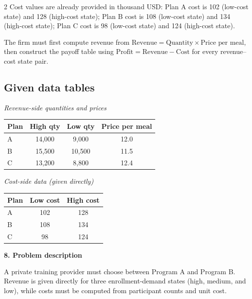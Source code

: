\documentclass[12pt]{article}
\newcommand{\SubsectionBox}[1]{%
	\noindent\colorbox{gray!30}{%
		\parbox{\linewidth}{\textbf{#1}}%
	}\par\vspace{0.35cm}%
}
\begin{document}
\begin{multicols}{2}
				Cost values are already provided in thousand USD:
				Plan A cost is 102 (low-cost state) and 128 (high-cost state);
				Plan B cost is 108 (low-cost state) and 134 (high-cost state);
				Plan C cost is 98 (low-cost state) and 124 (high-cost state).
				
				The firm must first compute revenue from
				\(\text{Revenue}=\text{Quantity}\times\text{Price per meal}\), then construct the payoff table using
				\(\text{Profit}=\text{Revenue}-\text{Cost}\) for every revenue--cost state pair.
				\subsection*{Given data tables}
				\begin{center}
					\begin{minipage}[t]{0.48\linewidth}
						\textit{Revenue-side quantities and prices}
						\begin{center}
							\begin{tabular}{l c c c}
								\toprule
								Plan & High qty & Low qty & Price per meal \\
								\midrule
								A & 14{,}000 & 9{,}000 & 12.0 \\
								B & 15{,}500 & 10{,}500 & 11.5 \\
								C & 13{,}200 & 8{,}800 & 12.4 \\
								\bottomrule
							\end{tabular}
						\end{center}
					\end{minipage}
					\hfill
					\begin{minipage}[t]{0.48\linewidth}
						\textit{Cost-side data (given directly)}
						\begin{center}
							\begin{tabular}{l c c}
								\toprule
								Plan & Low cost & High cost \\
								\midrule
								A & 102 & 128 \\
								B & 108 & 134 \\
								C & 98 & 124 \\
								\bottomrule
							\end{tabular}
						\end{center}
					\end{minipage}
				\end{center}

		\vspace{0.25cm}
		\SubsectionBox{8. Problem description}\vspace{-0.25cm}
		A private training provider must choose between Program A and Program B.
				Revenue is given directly for three enrollment-demand states (high, medium, and low), while costs must be computed from participant counts and unit cost.
				

\end{multicols}
\end{document}

